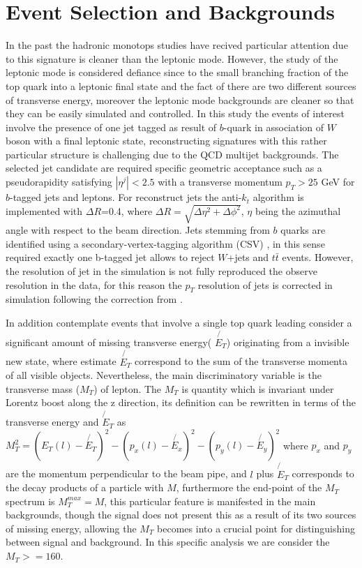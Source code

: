 \section{Event Selection and Backgrounds}

\label{event_selection}
\noindent In the past the hadronic monotops studies have recived particular attention due to this signature is cleaner than the leptonic mode. However, the study of the leptonic mode is considered defiance since to the small branching fraction of the top quark into a leptonic final state and the fact of there are two different sources of transverse energy, moreover the leptonic mode backgrounds are cleaner so that they can be easily simulated and controlled. In this study the events of interest involve the presence of one jet tagged as result of $b$-quark in association of $W$ boson with a final leptonic state, reconstructing signatures with this rather particular structure is challenging due to the QCD multijet backgrounds. The selected jet candidate are required specific geometric acceptance such as a pseudorapidity satisfying $|\eta ^{j}| < 2.5$ with a transverse momentum $p_{T}> 25$ GeV for $b$-tagged jets and leptons. For reconstruct jets the anti-$k_{t}$ algorithm is implemented \cite{325} with $\Delta R$=0.4, where $\Delta R = \sqrt{\Delta \eta ^{2}+\Delta \phi ^{2}}$, $\eta$ being the azimuthal angle with respect to the beam direction. Jets stemming from $b$ quarks are identified using a secondary-vertex-tagging algorithm (CSV) \cite{326}, in this sense required exactly one b-tagged jet allows to reject $W$+jets and $t\bar{t}$ events. However, the resolution of jet in the simulation is not fully reproduced the observe resolution in the data, for this reason the $p_{T}$ resolution of jets is corrected in simulation following the correction from \cite{327}.

In addition contemplate events that involve a single top quark leading consider a significant amount of missing transverse energy( $\not{E_{T}}$) originating from a invisible new state, where estimate $\not{E_{T}}$ correspond to the sum of the transverse momenta of all visible objects. Nevertheless, the main discriminatory variable is the transverse mass ($M_{T}$) of lepton. The $M_{T}$ is quantity which is invariant under Lorentz boost along the z direction, its definition can be rewritten in terms of the transverse energy and $\not{E}_{T}$ as $M^{2}_{T}=(E_{T}(l)-\not{E_{T}})^{2}-(p_{x}(l)-\not{E_{x}})^{2}-(p_{y}(l)-\not{E_{y}})^{2}$ where $p_{x}$ and $p_{y}$ are the momentum perpendicular to the beam pipe, and $l$ plus $\not{E}_{T}$ corresponds to the decay products of a particle with $M$, furthermore the end-point of the $M_{T}$ spectrum is $M^{max}_{T}=M$\cite{328}, this particular feature is manifested in the main backgrounds, though the signal does not present this as a result of its two sources of missing energy, allowing the $M_{T}$ becomes into a crucial point for distinguishing between signal and background. In this specific analysis we are consider the $M_{T}>=160$. 

